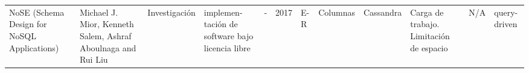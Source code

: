 \begin{landscape}
\begin{longtable}{  p{2.6cm}| p{1.7cm}| l| p{1.8cm}| p{1.7cm}|  p{1.1cm}| p{1.2cm}| p{1.7cm}| p{1.9cm}| p{1.6cm}| p{1.5cm}| p{1.5cm}  }
		NoSE (Schema Design for NoSQL Applications) & Michael J. Mior, Kenneth Salem, Ashraf Aboulnaga and Rui Liu & Investigación & implemen-tación de software bajo licencia libre & - & 2017 & E-R & Columnas & Cassandra & Carga de trabajo. Limitación de espacio & N/A & query-driven \\
		
		
	\end{longtable}
	
\end{landscape}

